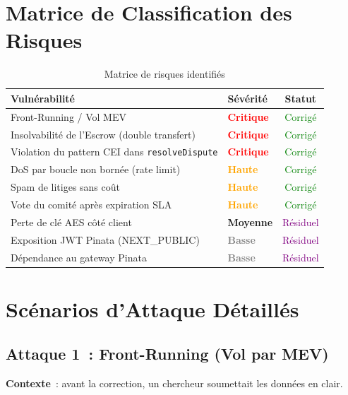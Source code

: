 \documentclass[12pt, a4paper]{report}
\begin{document}
\section{Matrice de Classification des Risques}
\begin{table}[H]
\centering
\begin{tabular}{@{}llc@{}}
\toprule
\textbf{Vuln\'{e}rabilit\'{e}} & \textbf{S\'{e}v\'{e}rit\'{e}} & \textbf{Statut} \\ \midrule
Front-Running / Vol MEV & \textcolor{red}{\textbf{Critique}} & \textcolor{green}{Corrig\'{e}} \\
Insolvabilit\'{e} de l'Escrow (double transfert) & \textcolor{red}{\textbf{Critique}} & \textcolor{green}{Corrig\'{e}} \\
Violation du pattern CEI dans \texttt{resolveDispute} & \textcolor{red}{\textbf{Critique}} & \textcolor{green}{Corrig\'{e}} \\
DoS par boucle non born\'{e}e (rate limit) & \textcolor{orange}{\textbf{Haute}} & \textcolor{green}{Corrig\'{e}} \\
Spam de litiges sans co\^{u}t & \textcolor{orange}{\textbf{Haute}} & \textcolor{green}{Corrig\'{e}} \\
Vote du comit\'{e} apr\`{e}s expiration SLA & \textcolor{orange}{\textbf{Haute}} & \textcolor{green}{Corrig\'{e}} \\
Perte de cl\'{e} AES c\^{o}t\'{e} client & \textcolor{yellow!80!black}{\textbf{Moyenne}} & \textcolor{purple}{R\'{e}siduel} \\
Exposition JWT Pinata (NEXT\_PUBLIC) & \textcolor{gray}{\textbf{Basse}} & \textcolor{purple}{R\'{e}siduel} \\
D\'{e}pendance au gateway Pinata & \textcolor{gray}{\textbf{Basse}} & \textcolor{purple}{R\'{e}siduel} \\ \bottomrule
\end{tabular}
\caption{Matrice de risques identifi\'{e}s}
\end{table}

\section{Sc\'{e}narios d'Attaque D\'{e}taill\'{e}s}

\subsection{Attaque 1~: Front-Running (Vol par MEV)}
\textbf{Contexte}~: avant la correction, un chercheur soumettait les donn\'{e}es en clair.
\end{document}
